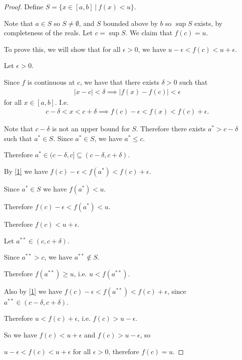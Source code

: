 \documentclass[12pt]{article}
\begin{document}
\begin{proof}
  Define $S = \{x \in [a, b] ~|~ f(x) < u\}$.

  Note that $a \in S$ so $S \neq \emptyset$, and $S$ bounded above by $b$ so $\sup S$ exists, by
  completeness of the reals. Let $c = \sup S$. We claim that $f(c) = u$.

  To prove this, we will show that for all $\epsilon > 0$, we have
  $u - \epsilon < f(c) < u + \epsilon$.

  Let $\epsilon > 0$.

  Since $f$ is continuous at $c$, we have that there exists $\delta > 0$ such that
  \begin{align} \label{1}
    |x - c| < \delta \implies |f(x) - f(c)| < \epsilon
  \end{align}
  for all $x \in [a, b]$. I.e.
  \begin{align*}
    c - \delta < x < c + \delta \implies f(c) - \epsilon < f(x) < f(c) + \epsilon.
  \end{align*}

  Note that $c - \delta$ is not an upper bound for $S$. Therefore there exists $a^* > c - \delta$
  such that $a^* \in S$. Since $a^* \in S$, we have $a^* \leq c$.

  Therefore $a^* \in (c - \delta, c] \subseteq (c - \delta, c + \delta)$.

  By \eqref{1} we have $f(c) - \epsilon < f(a^*) < f(c) + \epsilon$.

  Since $a^* \in S$ we have $f(a^*) < u$.

  Therefore $f(c) - \epsilon < f(a^*) < u$.

  Therefore $f(c) < u + \epsilon$.

  Let $a^{**} \in (c, c + \delta)$.

  Since $a^{**} > c$, we have $a^{**} \notin S$.

  Therefore $f(a^{**}) \geq u$, i.e. $u < f(a^{**})$.

  Also by \eqref{1} we have $f(c) - \epsilon < f(a^{**}) < f(c) + \epsilon$, since
  $a^{**} \in (c - \delta, c + \delta)$.

  Therefore $u < f(c) + \epsilon$, i.e. $f(c) > u - \epsilon$.

  So we have $f(c) < u + \epsilon$ and $f(c) > u - \epsilon$, so

  $u - \epsilon < f(c) < u + \epsilon$ for all $\epsilon > 0$, therefore $f(c) = u$.
\end{proof}
\end{document}

